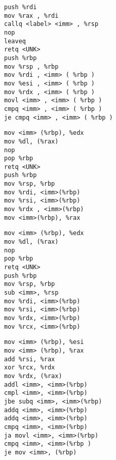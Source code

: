 \documentclass[target=mst,aauheader=aics]{thud}
\theoremstyle{definition}
\begin{document}
	\begin{minipage}{.45\textwidth}
		\begin{lstlisting}[basicstyle=\footnotesize\ttfamily, caption={Window 369-379}, label=gadget1]
push %rdi
mov %rax , %rdi
callq <label> <imm> , %rsp
nop
leaveq
retq <UNK>
push %rbp
mov %rsp , %rbp
mov %rdi , <imm> ( %rbp )
mov %esi , <imm> ( %rbp )
mov %rdx , <imm> ( %rbp )
movl <imm> , <imm> ( %rbp )
cmpq <imm> , <imm> ( %rbp )
je cmpq <imm> , <imm> ( %rbp )
		\end{lstlisting}
	\end{minipage}\hfill
	\begin{minipage}{.45\textwidth}
		\begin{lstlisting}[caption={Window 7992-7997}, label=gadget2, numbers=right]
mov <imm> (%rbp), %edx
mov %dl, (%rax)
nop
pop %rbp
retq <UNK>
push %rbp
mov %rsp, %rbp
mov %rdi, <imm>(%rbp)
mov %rsi, <imm>(%rbp)
mov %rdx , <imm>(%rbp)
mov <imm>(%rbp), %rax
		\end{lstlisting}
	\end{minipage}

	\begin{minipage}{.45\textwidth}
	\begin{lstlisting}[caption={Window 11024-11031}, label=gadget3]
mov <imm> (%rbp), %edx
mov %dl, (%rax)
nop
pop %rbp
retq <UNK>
push %rbp
mov %rsp, %rbp
sub <imm>, %rsp
mov %rdi, <imm>(%rbp)
mov %rsi, <imm>(%rbp)
mov %rdx, <imm>(%rbp)
mov %rcx, <imm>(%rbp)
	\end{lstlisting}
\end{minipage}\hfill
\begin{minipage}{.45\textwidth}
	\begin{lstlisting}[basicstyle=\footnotesize\ttfamily, caption={Window 11351-11392}, label=gadget4, numbers=right]
mov <imm> (%rbp), %esi
mov <imm> (%rbp), %rax
add %rsi, %rax
xor %rcx, %rdx
mov %rdx, (%rax)
addl <imm>, <imm>(%rbp)
cmpl <imm>, <imm>(%rbp)
jbe subq <imm>, <imm>(%rbp)
addq <imm>, <imm>(%rbp)
addq <imm>, <imm>(%rbp)
cmpq <imm>, <imm>(%rbp)
ja movl <imm>, <imm>(%rbp)
cmpq <imm>, <imm>(%rbp )
je mov <imm>, (%rbp)
	\end{lstlisting}
\end{minipage}
\end{document}
